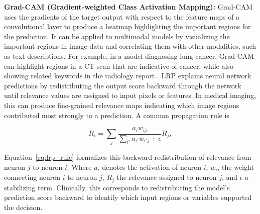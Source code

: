 \documentclass[pdflatex,sn-mathphys-num]{sn-jnl}%
\theoremstyle{thmstyleone}%
\theoremstyle{thmstyletwo}%
\theoremstyle{thmstylethree}%
\begin{document}
\begin{itemize}
    \textbf{Grad-CAM (Gradient-weighted Class Activation Mapping):} Grad-CAM uses the gradients of the target output with respect to the feature maps of a convolutional layer to produce a heatmap highlighting the important regions for the prediction. It can be applied to multimodal models by visualizing the important regions in image data and correlating them with other modalities, such as text descriptions. For example, in a model diagnosing lung cancer, Grad-CAM can highlight regions in a CT scan that are indicative of cancer, while also showing related keywords in the radiology report \cite{Selvaraju_2019,raghavan2024attention}. 
LRP explains neural network predictions by redistributing the output score backward through the network until relevance values are assigned to input pixels or features. In medical imaging, this can produce fine-grained relevance maps indicating which image regions contributed most strongly to a prediction. A common propagation rule is

\begin{equation}
R_i = \sum_j \frac{a_i w_{ij}}{\sum_{i'} a_{i'} w_{i'j} + \epsilon} R_j ,
\label{eq:lrp_rule}
\end{equation}

Equation~\eqref{eq:lrp_rule} formalizes this backward redistribution of relevance from neuron \(j\) to neuron \(i\). Where \(a_i\) denotes the activation of neuron \(i\), \(w_{ij}\) the weight connecting neuron \(i\) to neuron \(j\), \(R_j\) the relevance assigned to neuron \(j\), and \(\epsilon\) a stabilizing term. Clinically, this corresponds to redistributing the model's prediction score backward to identify which input regions or variables supported the decision.


\end{itemize}
\end{document}
